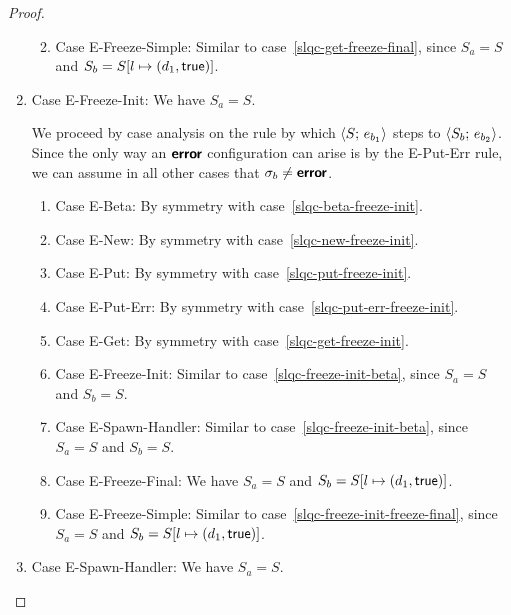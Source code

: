 \begin{proof}
\begin{enumerate}
\begin{enumerate}
      \TODO{}
    \item \label{slqc-get-freeze-simple}Case {\sc E-Freeze-Simple}:
      Similar to case~\ref{slqc-get-freeze-final}, since $S_a = S$ and $S_b =
      S[l \mapsto (d_1, \textsf{true})]$.
    \end{enumerate}

  \item Case {\sc E-Freeze-Init}: We have $S_a = S$.

    We proceed by case analysis on the rule by which
    $\langle S;\, e_{b_1} \rangle$ steps to $\langle S_b;\, e_{b_2} \rangle$.  Since the
    only way an $\textbf{\textsf{error}}$ configuration can arise is by the {\sc
      E-Put-Err} rule, we can assume in all other cases that $\sigma_b
    \neq \textbf{\textsf{error}}$.
    \begin{enumerate}
    \item \label{slqc-freeze-init-beta}Case {\sc E-Beta}: By symmetry with case~\ref{slqc-beta-freeze-init}.
    \item \label{slqc-freeze-init-new}Case {\sc E-New}: By symmetry with case~\ref{slqc-new-freeze-init}.
    \item \label{slqc-freeze-init-put}Case {\sc E-Put}: By symmetry with case~\ref{slqc-put-freeze-init}.
    \item \label{slqc-freeze-init-put-err}Case {\sc E-Put-Err}: By symmetry with case~\ref{slqc-put-err-freeze-init}.
    \item \label{slqc-freeze-init-get}Case {\sc E-Get}: By symmetry with case~\ref{slqc-get-freeze-init}.
    \item \label{slqc-freeze-init-freeze-init}Case {\sc
      E-Freeze-Init}: Similar to case~\ref{slqc-freeze-init-beta},
      since $S_a = S$ and $S_b = S$.
    \item \label{slqc-freeze-init-spawn-handler}Case {\sc
      E-Spawn-Handler}: Similar to case~\ref{slqc-freeze-init-beta},
      since $S_a = S$ and $S_b = S$.
    \item \label{slqc-freeze-init-freeze-final}Case {\sc
      E-Freeze-Final}: We have $S_a = S$ and $S_b =
      S[l \mapsto (d_1, \textsf{true})]$.

      \TODO{}
    \item \label{slqc-freeze-init-freeze-simple}Case {\sc
      E-Freeze-Simple}: Similar to
      case~\ref{slqc-freeze-init-freeze-final}, since $S_a = S$ and
      $S_b = S[l \mapsto (d_1, \textsf{true})]$.
    \end{enumerate}

  \item Case {\sc E-Spawn-Handler}: We have $S_a = S$.


\end{enumerate}
\end{proof}
